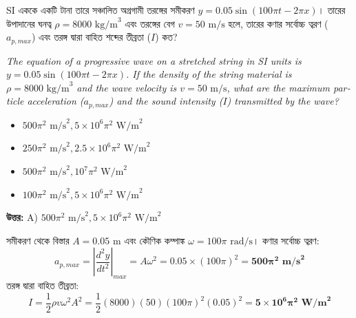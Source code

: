 \documentclass[12pt, a4paper]{article}
\begin{document}
\begin{tcolorbox}[questionbox={প্রশ্ন (Question) 5}]
    \noindent
    SI এককে একটি টানা তারে সঞ্চালিত অগ্রগামী তরঙ্গের সমীকরণ $y = 0.05 \sin(100\pi t - 2\pi x)$। তারের উপাদানের ঘনত্ব $\rho = 8000\text{ kg/m}^3$ এবং তরঙ্গের বেগ $v = 50\text{ m/s}$ হলে, তারের কণার সর্বোচ্চ ত্বরণ ($a_{p,max}$) এবং তরঙ্গ দ্বারা বাহিত শব্দের তীব্রতা ($I$) কত?
    
    \vspace{0.8em}
    \begin{english}
    \noindent\textit{\color{darkgray}
    The equation of a progressive wave on a stretched string in SI units is $y = 0.05 \sin(100\pi t - 2\pi x)$. If the density of the string material is $\rho = 8000\text{ kg/m}^3$ and the wave velocity is $v = 50\text{ m/s}$, what are the maximum particle acceleration ($a_{p,max}$) and the sound intensity ($I$) transmitted by the wave?
    }
    \end{english}
\end{tcolorbox}

\begin{itemize}[label={}, leftmargin=1cm, itemsep=0.5em]
    \item[\textbf{A)}] $500\pi^2\text{ m/s}^2, 5 \times 10^6\pi^2\text{ W/m}^2$
    \item[\textbf{B)}] $250\pi^2\text{ m/s}^2, 2.5 \times 10^6\pi^2\text{ W/m}^2$
    \item[\textbf{C)}] $500\pi^2\text{ m/s}^2, 10^7\pi^2\text{ W/m}^2$
    \item[\textbf{D)}] $100\pi^2\text{ m/s}^2, 5 \times 10^6\pi^2\text{ W/m}^2$
\end{itemize}

\vspace{0.5em}
\begin{tcolorbox}[answerbox]
    \textbf{\color{success} উত্তর:} A) $500\pi^2\text{ m/s}^2, 5 \times 10^6\pi^2\text{ W/m}^2$
\end{tcolorbox}
\vspace{1em}

\begin{tcolorbox}[solutionbox={সমাধান (Solution)}]
    \noindent
    সমীকরণ থেকে বিস্তার $A = 0.05\text{ m}$ এবং কৌণিক কম্পাঙ্ক $\omega = 100\pi\text{ rad/s}$। কণার সর্বোচ্চ ত্বরণ:
    \[ a_{p,max} = \left|\frac{d^2y}{dt^2}\right|_{max} = A\omega^2 = 0.05 \times (100\pi)^2 = \mathbf{500\pi^2\text{ m/s}^2} \]
    তরঙ্গ দ্বারা বাহিত তীব্রতা:
    \[ I = \frac{1}{2} \rho v \omega^2 A^2 = \frac{1}{2} (8000) (50) (100\pi)^2 (0.05)^2 = \mathbf{5 \times 10^6\pi^2\text{ W/m}^2} \]
\end{tcolorbox}
\end{document}
